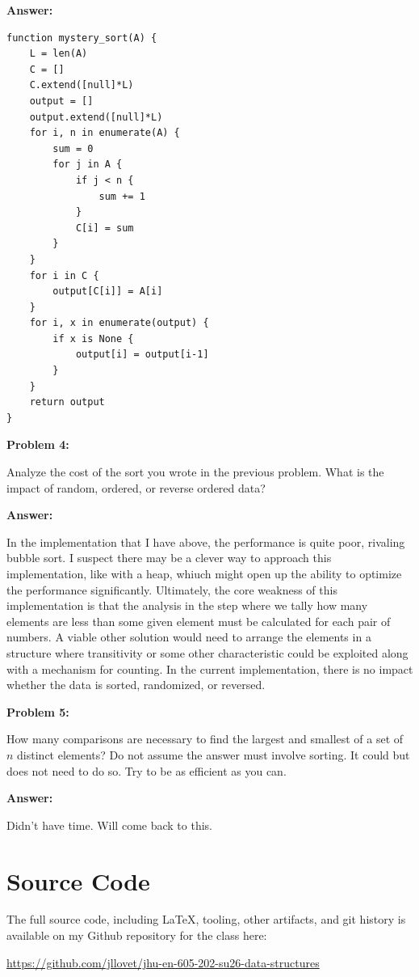 \documentclass[10pt,letterpaper,final]{report}
\begin{document}
\medskip
\noindent\textbf{Answer:}
\medskip

\begin{verbatim}
function mystery_sort(A) {
    L = len(A)
    C = []
    C.extend([null]*L)
    output = []
    output.extend([null]*L)
    for i, n in enumerate(A) {
        sum = 0
        for j in A {
            if j < n {
                sum += 1
            }
            C[i] = sum
        }
    }
    for i in C {
        output[C[i]] = A[i]
    }
    for i, x in enumerate(output) {
        if x is None {
            output[i] = output[i-1]
        }
    }
    return output
}
\end{verbatim}

\medskip
\noindent\textbf{Problem 4:}
\medskip

Analyze the cost of the sort you wrote in the previous problem. What is the impact of random, ordered, or reverse ordered data?

\medskip
\noindent\textbf{Answer:}
\medskip

In the implementation that I have above, the performance is quite poor, rivaling bubble sort. I suspect there may be a clever way to approach this implementation, like with a heap, whiuch might open up the ability to optimize the performance significantly. Ultimately, the core weakness of this implementation is that the analysis in the step where we tally how many elements are less than some given element must be calculated for each pair of numbers. A viable other solution would need to arrange the elements in a structure where transitivity or some other characteristic could be exploited along with a mechanism for counting. In the current implementation, there is no impact whether the data is sorted, randomized, or reversed.


\medskip
\noindent\textbf{Problem 5:}
\medskip

How many comparisons are necessary to find the largest and smallest of a set of $n$ distinct elements? Do not assume the answer must involve sorting. It could but does not need to do so. Try to be as efficient as you can.

\medskip
\noindent\textbf{Answer:}
\medskip

Didn't have time. Will come back to this.

\pagebreak

\section*{Source Code}
The full source code, including LaTeX, tooling, other artifacts, and git history is available on my Github repository for the class here:
\begin{center}
  \url{https://github.com/jllovet/jhu-en-605-202-su26-data-structures}
\end{center}

\printbibliography
\end{document}
